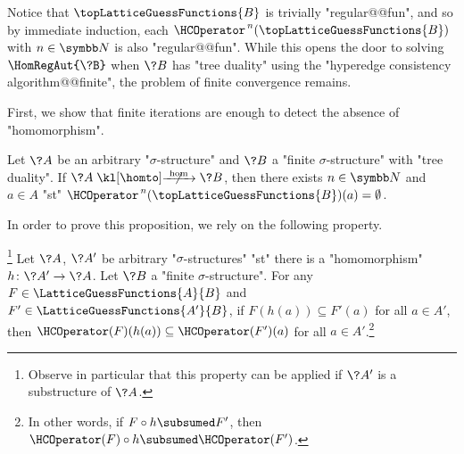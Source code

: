 Notice that $\topLatticeGuessFunctions{B}$ is trivially "regular@@fun", and so
by immediate induction, each $\HCOperator^{\,n}(\topLatticeGuessFunctions{B})$ with $n\in \N$ is
also "regular@@fun". While this opens the door to solving $\HomRegAut{\?B}$ when $\?B$ has
"tree duality" using the "hyperedge consistency algorithm@@finite", the problem
of finite convergence remains.

First, we show that finite iterations are enough to detect the absence of "homomorphism".
\begin{proposition}
	\AP\label{prop:hyperedge-consistency-no-hom}
	Let $\?A$ be an arbitrary "$\sigma$-structure" and $\?B$ a "finite $\sigma$-structure"
	with "tree duality". If $\?A \nothomto \?B$, then there exists $n\in\N$ and $a\in A$ "st"
	$\HCOperator^{\,n}(\topLatticeGuessFunctions{B})(a) = \emptyset$. 
\end{proposition}

In order to prove this proposition, we rely on the following property.
\begin{property}
	\!\footnote{Observe in particular that this property can be applied if $\?A'$ is a
	substructure of $\?A$.}%
	\AP\label{prop:hyperedge-consistency-antimonotonicity}
	Let $\?A$, $\?A'$ be arbitrary "$\sigma$-structures" "st"
	there is a "homomorphism" $h\colon \?A' \to \?A$. Let $\?B$ a "finite $\sigma$-structure".
	For any $F\in \LatticeGuessFunctions{A}{B}$ and $F' \in \LatticeGuessFunctions{A'}{B}$,
	if $F(h(a)) \subseteq F'(a)$ for all $a\in A'$, then $\HCOperator(F)(h(a)) \subseteq \HCOperator(F')(a)$ for all $a\in A'$.\footnote{In other words, if $F \circ h \subsumed F'$, then
	$\HCOperator(F) \circ h \subsumed \HCOperator(F')$.}
\end{property}

